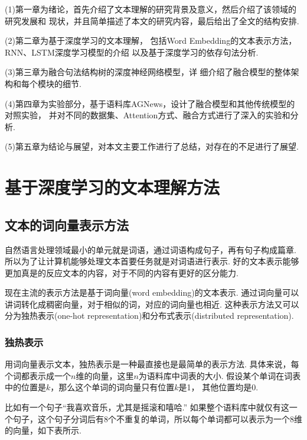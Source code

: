 \documentclass[bachelor,adobefonts]{jnuthesis}
\begin{document}
(1)第一章为绪论，首先介绍了文本理解的研究背景及意义，然后介绍了该领域的研究发展和 现状，并且简单描述了本文的研究内容，最后给出了全文的结构安排.

(2)第二章为基于深度学习的文本理解，
包括Word Embedding的文本表示方法，RNN、LSTM深度学习模型的介绍
以及基于深度学习的依存句法分析.

(3)第三章为融合句法结构树的深度神经网络模型，详
细介绍了融合模型的整体架构和每个模块的细节.

(4)第四章为实验部分，基于语料库AGNews，设计了融合模型和其他传统模型的对照实验，
并对不同的数据集、Attention方式、融合方式进行了深入的实验和分析.

(5)第五章为结论与展望，对本文主要工作进行了总结，对存在的不足进行了展望.


\chapter{基于深度学习的文本理解方法}
\section{文本的词向量表示方法}
自然语言处理领域最小的单元就是词语，通过词语构成句子，再有句子构成篇章.
所以为了让计算机能够处理文本首要任务就是对词语进行表示.
好的文本表示能够更加真是的反应文本的内容，对于不同的内容有更好的区分能力.

现在主流的表示方法是基于词向量(word embedding)的文本表示.
通过词向量可以讲词转化成稠密向量，对于相似的词，对应的词向量也相近.
这种表示方法又可以分为独热表示(one-hot representation)和分布式表示(distributed representation).

\subsection{独热表示}
用词向量表示文本，独热表示是一种最直接也是最简单的表示方法.
具体来说，每个词都表示成一个$n$维的向量，这里$n$为语料库中词表的大小.
假设某个单词在词表中的位置是$k$，那么这个单词的词向量只有位置$k$是1，
其他位置均是0.

比如有一个句子“我喜欢音乐，尤其是摇滚和嘻哈.”
如果整个语料库中就仅有这一个句子，这个句子分词后有8个不重复的单词，所以每个单词都可以表示为一个8维的向量，如下表所示.
\end{document}
